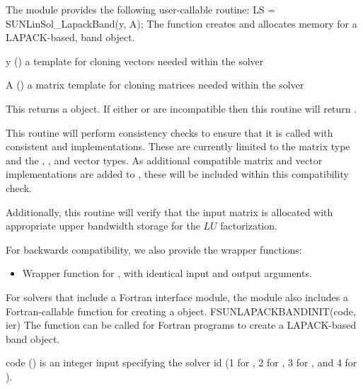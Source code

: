 The module {\sunlinsollapband} provides the following user-callable routine: 
{
  LS = SUNLinSol\_LapackBand(y, A);
}
{
  The function  creates and allocates
  memory for a LAPACK-based, band  object.
}
{
  \begin{args}[y]
  \item[y] ()
    a template for cloning vectors needed within the solver
  \item[A] ()
    a {\sunmatband} matrix template for cloning matrices needed
    within the solver 
  \end{args}
}
{
  This returns a  object.  If either  or
   are incompatible then this routine will return .
}
{
  This routine will perform consistency checks to ensure that it is
  called with consistent {\nvector} and {\sunmatrix} implementations.
  These are currently limited to the {\sunmatband} matrix type and
  the {\nvecs}, {\nvecopenmp}, and {\nvecpthreads} vector types.  As
  additional compatible matrix and vector implementations are added to
  {\sundials}, these will be included within this compatibility check.
  
  Additionally, this routine will verify that the input matrix 
  is allocated with appropriate upper bandwidth storage for the $LU$
  factorization.
}
For backwards compatibility, we also provide the wrapper functions:
\begin{itemize}

\item {}

  Wrapper function for , with identical input and
  output arguments.

\end{itemize}
For solvers that include a Fortran interface module, the
{\sunlinsollapband} module also includes  a Fortran-callable function
for creating a  object.
{
  FSUNLAPACKBANDINIT(code, ier)
}
{
  The function  can be called for Fortran programs
  to create a LAPACK-based band  object.
}
{
  \begin{args}[code]
  \item[code] ()
    is an integer input specifying the solver id (1 for {\cvode}, 2
    for {\ida}, 3 for {\kinsol}, and 4 for {\arkode}).
  \end{args}
}
